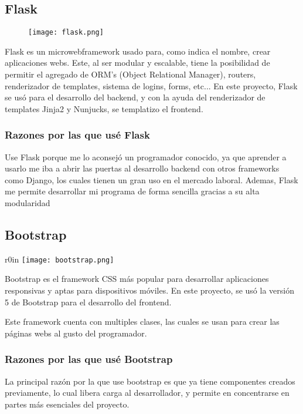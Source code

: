 \documentclass[../informe_krapp.tex]{subfiles}
\begin{document}
\subsection{Flask}
\begin{figure}[H]
	\texttt{[image: flask.png]}
	\centering
\end{figure}
Flask es un microwebframework usado para, como indica el nombre, crear aplicaciones webs. Este, al ser modular y escalable, tiene la posibilidad
de permitir el agregado de ORM's (Object Relational Manager), routers, renderizador de templates, sistema de logins,
forms, etc...
En este proyecto, Flask se usó para el desarrollo del backend, y con la ayuda del renderizador de templates Jinja2 y Nunjucks, se templatizo el frontend.

\subsubsection{Razones por las que usé Flask}
Use Flask porque me lo aconsejó un programador conocido, ya que aprender a usarlo me iba a abrir las puertas al desarrollo backend con otros
frameworks como Django, los cuales tienen un gran uso en el mercado laboral.
Ademas, Flask me permite desarrollar mi programa de forma sencilla gracias a su alta modularidad


\subsection{Bootstrap}
\begin{wrapfigure}{r}{0in}
	\texttt{[image: bootstrap.png]}
\end{wrapfigure}
Bootstrap es el framework CSS más popular para desarrollar aplicaciones responsivas y aptas para dispositivos móviles.
En este proyecto, se usó la versión 5 de Bootstrap para el desarrollo del frontend.

Este framework cuenta con multiples clases, las cuales se usan para crear las páginas webs al gusto del programador.

\subsubsection{Razones por las que usé Bootstrap}
La principal razón por la que use bootstrap es que ya tiene componentes creados previamente, lo cual libera carga al desarrollador, y permite en concentrarse en partes más esenciales del proyecto.
\clearpage
\end{document}
